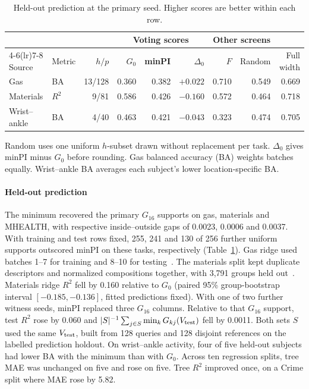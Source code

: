 \begin{table}[!htbp]
\centering\small
\caption{Held-out prediction at the primary seed. Higher scores are better within each row.}
\label{tab:reliability}
\setlength{\tabcolsep}{3pt}
\begin{tabular*}{\linewidth}{@{\extracolsep{\fill}}llrrrrrrr@{}}
\toprule
 & & & \multicolumn{3}{c}{Voting scores} & \multicolumn{2}{c}{Other screens} & \\
\cmidrule(lr){4-6}\cmidrule(lr){7-8}
Source & Metric & $h/p$ & $G_0$ & \textbf{minPI} & $\Delta_0$ & $F$ & Random & Full width\\
\midrule
Gas & BA & 13/128 & 0.360 & 0.382 & $+0.022$ & 0.710 & 0.549 & 0.669\\
Materials & $R^2$ & 9/81 & 0.586 & 0.426 & $-0.160$ & 0.572 & 0.464 & 0.718\\
Wrist--ankle & BA & 4/40 & 0.463 & 0.421 & $-0.043$ & 0.323 & 0.474 & 0.705\\
\bottomrule
\end{tabular*}
\par\smallskip
\begin{minipage}{\linewidth}\footnotesize
Random uses one uniform $h$-subset drawn without replacement per task. $\Delta_0$ gives minPI minus $G_0$ before rounding. Gas balanced accuracy (BA) weights batches equally. Wrist--ankle BA averages each subject's lower location-specific BA.
\end{minipage}
\end{table}

\paragraph{Held-out prediction}
The minimum recovered the primary $G_{16}$ supports on gas, materials and MHEALTH, with respective inside--outside gaps of 0.0023, 0.0006 and 0.0037. With training and test rows fixed, 255, 241 and 130 of 256 further uniform supports outscored minPI on these tasks, respectively (Table~\ref{tab:reliability}). Gas ridge used batches 1--7 for training and 8--10 for testing~\citep{vergara2012gas}. The materials split kept duplicate descriptors and normalized compositions together, with 3,791 groups held out~\citep{hamidieh2018}. Materials ridge $R^2$ fell by 0.160 relative to $G_0$ (paired 95\% group-bootstrap interval $[-0.185,-0.136]$, fitted predictions fixed). With one of two further witness seeds, minPI replaced three $G_{16}$ columns. Relative to that $G_{16}$ support, test $R^2$ rose by 0.060 and $|S|^{-1}\sum_{j\in S}\min_k G_{kj}(V_{\rm test})$ fell by 0.0011. Both sets $S$ used the same $V_{\rm test}$, built from 128 queries and 128 disjoint references on the labelled prediction holdout. On wrist--ankle activity, four of five held-out subjects had lower BA with the minimum than with $G_0$. Across ten regression splits, tree MAE was unchanged on five and rose on five. Tree $R^2$ improved once, on a Crime split where MAE rose by 5.82.
